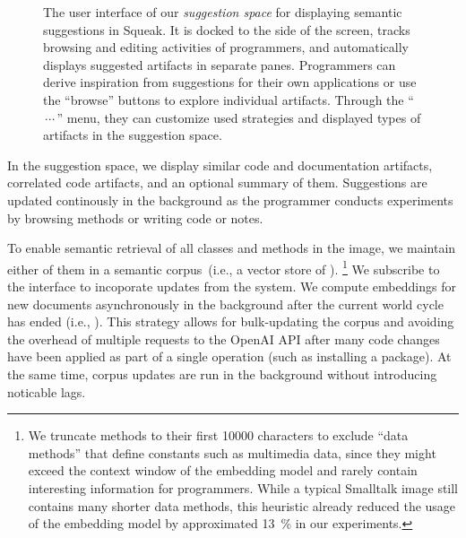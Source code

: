 \begin{figure}
	\caption[The user interface of our \emph{suggestion space} for displaying semantic suggestions in Squeak.]{
		The user interface of our \emph{suggestion space} for displaying semantic suggestions in Squeak.
		It is docked to the side of the screen, tracks browsing and editing activities of programmers, and automatically displays suggested artifacts in separate panes.
		Programmers can derive inspiration from suggestions for their own applications or use the ``browse'' buttons to explore individual artifacts.
		Through the ``$\,{\cdots}\,$'' menu, they can customize used strategies and displayed types of artifacts in the suggestion space.
	}
	\label{fig:implementation/suggestions/space}
\end{figure}

In the suggestion space, we display similar code and documentation artifacts, correlated code artifacts, and an optional summary of them.
Suggestions are updated continously in the background as the programmer conducts experiments by browsing methods or writing code or notes.

To enable semantic retrieval of all classes and methods in the image, we maintain either of them in a semantic corpus~(i.e., a vector store of \semtex).
\footnote{We truncate methods to their first \num{10000} characters to exclude ``data methods'' that define constants such as multimedia data, since they might exceed the context window of the embedding model and rarely contain interesting information for programmers. While a typical Smalltalk image still contains many shorter data methods, this heuristic already reduced the usage of the embedding model by approximated \qty{13}{\percent} in our experiments.}
We subscribe to the  interface to incoporate updates from the system.
We compute embeddings for new documents asynchronously in the background after the current world cycle has ended (i.e., ).
This strategy allows for bulk-updating the corpus and avoiding the overhead of multiple requests to the OpenAI API after many code changes have been applied as part of a single operation (such as installing a package).
At the same time, corpus updates are run in the background without introducing noticable lags.
